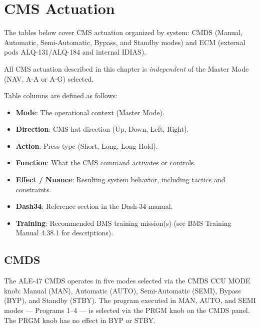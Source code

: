 \documentclass[11pt, a4paper, twoside]{report}
\newcommand{\trnman}{BMS Training Manual 4.38.1}
\begin{document}
\section{CMS Actuation}
\label{sec:C5-S2}

The tables below cover CMS actuation organized by system: CMDS (Manual, Automatic, Semi-Automatic, Bypass, and Standby modes) and ECM (external pods ALQ-131/ALQ-184 and internal IDIAS).

All CMS actuation described in this chapter is \textit{independent} of the Master Mode (NAV, A-A or A-G) selected.

Table columns are defined as follows:

\begin{itemize}
  \item \textbf{Mode}: The operational context (Master Mode).
  \item \textbf{Direction}: CMS hat direction (Up, Down, Left, Right).
  \item \textbf{Action}: Press type (Short, Long, Long Hold).
  \item \textbf{Function}: What the CMS command activates or controls.
  \item \textbf{Effect / Nuance}: Resulting system behavior, including tactics and constraints.
  \item \textbf{Dash34}: Reference section in the Dash-34 manual.
  \item \textbf{Training}: Recommended BMS training mission(s) (see \trnman{} for descriptions).
\end{itemize}

\subsection{CMDS}
\label{sec:C5-S2-S1}

The ALE-47 CMDS operates in five modes selected via the CMDS CCU MODE knob: Manual (MAN), Automatic (AUTO), Semi-Automatic (SEMI), Bypass (BYP), and Standby (STBY). The program executed in MAN, AUTO, and SEMI modes --- Programs 1--4 --- is selected via the PRGM knob on the CMDS panel. The PRGM knob has no effect in BYP or STBY.
\end{document}
